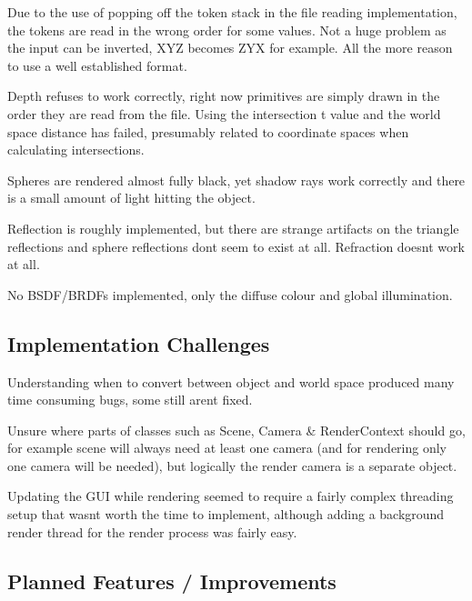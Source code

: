 \begin{DoxyItemize}
\item Due to the use of popping off the token stack in the file reading implementation, the tokens are read in the wrong order for some values. Not a huge problem as the input can be inverted, X\+Y\+Z becomes Z\+Y\+X for example. All the more reason to use a well established format.
\item Depth refuses to work correctly, right now primitives are simply drawn in the order they are read from the file. Using the intersection t value and the world space distance has failed, presumably related to coordinate spaces when calculating intersections.
\item Spheres are rendered almost fully black, yet shadow rays work correctly and there is a small amount of light hitting the object.
\item Reflection is roughly implemented, but there are strange artifacts on the triangle reflections and sphere reflections don\textquotesingle{}t seem to exist at all. Refraction doesn\textquotesingle{}t work at all.
\item No B\+S\+D\+F/\+B\+R\+D\+F\textquotesingle{}s implemented, only the diffuse colour and global illumination.
\end{DoxyItemize}

\subsection*{Implementation Challenges}


\begin{DoxyItemize}
\item Understanding when to convert between object and world space produced many time consuming bugs, some still aren\textquotesingle{}t fixed.
\item Unsure where parts of classes such as Scene, Camera \& Render\+Context should go, for example scene will always need at least one camera (and for rendering only one camera will be needed), but logically the render camera is a separate object.
\item Updating the G\+U\+I while rendering seemed to require a fairly complex threading setup that wasn\textquotesingle{}t worth the time to implement, although adding a background render thread for the render process was fairly easy.
\end{DoxyItemize}

\subsection*{Planned Features / Improvements}



